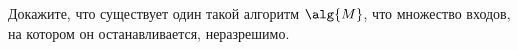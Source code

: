 Докажите, что существует один такой алгоритм $\alg{M}$, что множество входов, на котором он
останавливается, неразрешимо.

